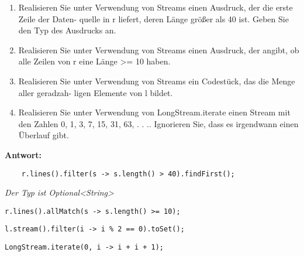 \begin{enumerate}
    \item Realisieren Sie unter Verwendung von Streams einen Ausdruck, der die erste
          Zeile der Daten- quelle in r liefert, deren Länge größer als 40 ist. Geben Sie
          den Typ des Ausdrucks an.
    \item Realisieren Sie unter Verwendung von Streams einen Ausdruck, der angibt, ob
          alle Zeilen von r eine Länge >= 10 haben.
    \item Realisieren Sie unter Verwendung von Streams ein Codestück, das die Menge aller
          geradzah- ligen Elemente von l bildet.
    \item Realisieren Sie unter Verwendung von LongStream.iterate einen Stream mit den
          Zahlen 0, 1, 3, 7, 15, 31, 63, . . .. Ignorieren Sie, dass es irgendwann einen
          Überlauf gibt.
\end{enumerate}

\textbf{Antwort:}

\begin{lstlisting}
    r.lines().filter(s -> s.length() > 40).findFirst();
\end{lstlisting} \textit{Der Typ ist Optional<String>}
\begin{lstlisting}
r.lines().allMatch(s -> s.length() >= 10);
\end{lstlisting}
\begin{lstlisting}
l.stream().filter(i -> i % 2 == 0).toSet();
\end{lstlisting}
\begin{lstlisting}
LongStream.iterate(0, i -> i + i + 1);
\end{lstlisting}

